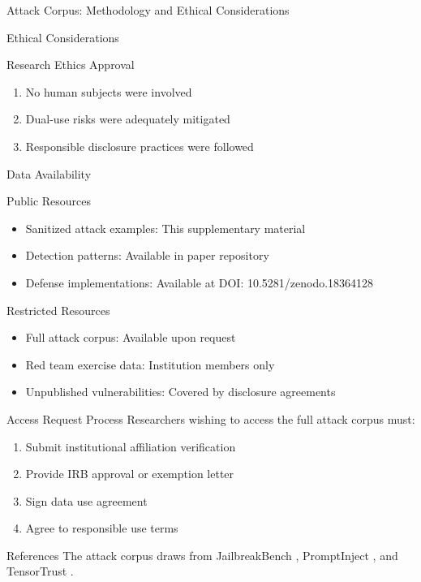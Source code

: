 \documentclass[
  ignorenonframetext,
]{beamer}
\begin{document}
\begin{frame}{Attack Corpus: Methodology and Ethical Considerations}
\begin{block}{Ethical Considerations}
\begin{block}{Research Ethics Approval}
\begin{enumerate}
\item No human subjects were involved
\item Dual-use risks were adequately mitigated
\item Responsible disclosure practices were followed
\end{enumerate}
\end{block}
\end{block}

\begin{block}{Data Availability}
\protect{}\label{sec:data-availability}
\begin{block}{Public Resources}
\protect{}\label{sec:public-resources}
\begin{itemize}
\item Sanitized attack examples: This supplementary material
\item Detection patterns: Available in paper repository
\item Defense implementations: Available at DOI: 10.5281/zenodo.18364128
\end{itemize}
\end{block}

\begin{block}{Restricted Resources}
\protect{}\label{sec:restricted-resources}
\begin{itemize}
\item Full attack corpus: Available upon request
\item Red team exercise data: Institution members only
\item Unpublished vulnerabilities: Covered by disclosure agreements
\end{itemize}
\end{block}

\begin{block}{Access Request Process}
\protect{}\label{sec:access-request}
Researchers wishing to access the full attack corpus must:

\begin{enumerate}
\item Submit institutional affiliation verification
\item Provide IRB approval or exemption letter
\item Sign data use agreement
\item Agree to responsible use terms
\end{enumerate}
\end{block}
\end{block}

\begin{block}{References}
\protect{}\label{sec:corpus-references}
The attack corpus draws from JailbreakBench
\cite{chao2024jailbreakbench}, PromptInject \cite{liu2023prompt}, and
TensorTrust \cite{toyer2024tensortrust}.
\end{block}
\end{frame}
\end{document}
